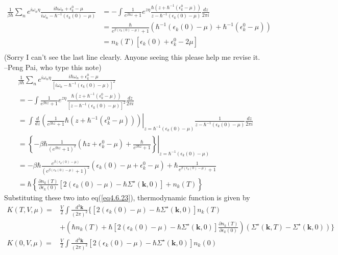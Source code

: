 \[
\begin{aligned}
\frac{1}{\beta\hbar} \sum_n e^{i\omega_n \eta} \frac{i\hbar \omega_n+\epsilon_k^0-\mu}{i\omega_n-\hbar^{-1}(\epsilon_k(0)-\mu)}
&=-\int\frac{1}{e^{\beta\hbar z}+1} e^{z\eta}  \frac{\hbar(z+\hbar^{-1}(\epsilon_k^0-\mu))}{z-\hbar^{-1}(\epsilon_k(0)-\mu)} \frac{dz}{2\pi i}\\
&=\frac{\hbar}{e^{\beta(\epsilon_k(0) -\mu)}+1} \left(\hbar^{-1}(\epsilon_k(0)-\mu)+\hbar^{-1}(\epsilon_k^0-\mu) \right)\\
&=n_k(T) \left[ \epsilon_k(0)+\epsilon_k^0-2\mu\right]\\
\end{aligned}
\]
(Sorry I can't see the last line clearly. Anyone seeing this please help me revise it. --Peng Pai, who type this note)
\[
\begin{aligned}
&\frac{1}{\beta\hbar} \sum_n e^{i\omega_n \eta} \frac{i\hbar \omega_n+\epsilon_k^0-\mu}{\left[ i\omega_n-\hbar^{-1}(\epsilon_k(0)-\mu)\right]^2}\\
&=-\int\frac{1}{e^{\beta\hbar z}+1} e^{z\eta}  \frac{\hbar(z+\hbar^{-1}(\epsilon_k^0-\mu))}{\left[ z-\hbar^{-1}(\epsilon_k(0)-\mu)\right]^2} \frac{dz}{2\pi i}\\
&=\int \frac{d}{dz}\left. \left( \frac{1}{e^{\beta\hbar z}+1} \hbar(z+\hbar^{-1}(\epsilon_k^0-\mu)) \right) \right|_{z=\hbar^{-1}(\epsilon_k(0)-\mu) }
 \frac{1}{z-\hbar^{-1}(\epsilon_k(0)-\mu)} \frac{dz}{2\pi i}\\
 &=\left. \left\{ -\beta\hbar \frac{1}{\left( e^{\beta\hbar z}+1\right)^2} (\hbar z+\epsilon_k^0-\mu) + \frac{\hbar}{e^{\beta\hbar z}+1}  \right\} \right|_{z=\hbar^{-1}(\epsilon_k(0)-\mu) }\\
 &= -\beta\hbar \frac{e^{\beta(\epsilon_k(0)-\mu)}}{\left( e^{\beta(\epsilon_k(0)-\mu)}+1\right)^2}  (\epsilon_k(0)-\mu+\epsilon_k^0 -\mu)
 	+\hbar  \frac{1}{ e^{\beta(\epsilon_k(0)-\mu)}+1} \\
&=\hbar\left\{ \frac{\partial n_k(T)}{\partial \epsilon_k(0)}  \left[  2(\epsilon_k(0)-\mu) -\hbar \Sigma^\star(\mathbf{k},0) \right] +n_k(T)  \right\}
\end{aligned}
\]
Substituting these two into eq(\ref{eq4.6.23}), thermodynamic function is given by
\[
\begin{aligned}
K(T,V,\mu)=&\frac{V}{2}\int \frac{d^3 \mathbf{k}}{(2\pi)^2} \Big\{ \left[ 2(\epsilon_k(0)-\mu)-\hbar \Sigma^\star (\mathbf{k},0) \right] n_k(T) \\
&+\left( \hbar n_k(T) +\hbar \left[ 2(\epsilon_k(0)-\mu)-\hbar \Sigma^\star (\mathbf{k},0) \right] \frac{\partial n_k(T)}{\partial \epsilon_k(0)} \right)(\Sigma^\star (\mathbf{k},T) -\Sigma^\star (\mathbf{k},0) ) \Big\}\\
K(0,V,\mu)=&\frac{V}{2}\int \frac{d^3 \mathbf{k}}{(2\pi)^2} \left[ 2(\epsilon_k(0)-\mu)-\hbar \Sigma^\star (\mathbf{k},0) \right] n_k(0)
\end{aligned}
\]
